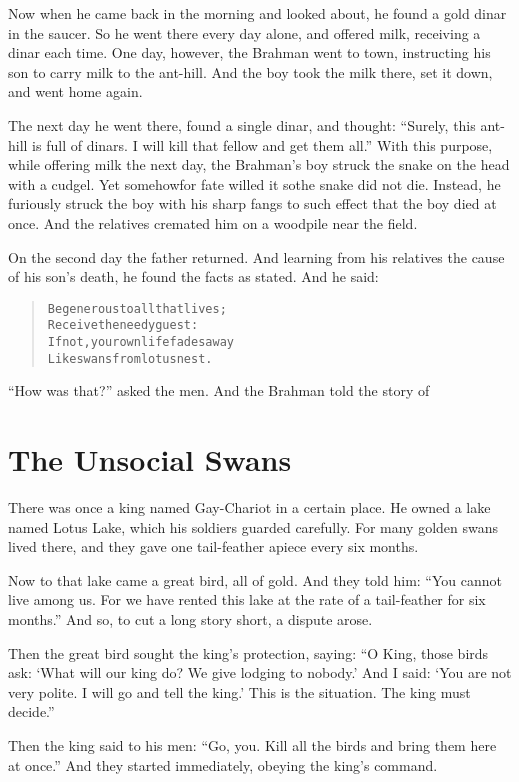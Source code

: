 \documentclass[article, twoside, 14pt]{memoir}
\renewenvironment{verbatim}{%
\begin{quote}%
\vskip -10pt%
\begin{alltt}\normalfont\large}{\end{alltt}%
\end{quote}%
\vskip -10pt
} %
\begin{document}
Now when he came back in the morning and looked about, he found a
gold dinar in the saucer. So he went there every day alone,
and offered milk, receiving a dinar each time. One day, however,
the Brahman went to town, instructing his son to carry milk to the
ant-hill. And the boy took the milk there, set it down, and went
home again.

The next day he went there, found a single dinar, and thought:
``Surely, this ant-hill is full of dinars. I will kill that fellow and get them all.''
With this purpose, while offering milk the next day, the Brahman's
boy struck the snake on the head with a cudgel. Yet somehow{\textemdash}for
fate willed it so{\textemdash}the snake did not die. Instead, he furiously
struck the boy with his sharp fangs to such effect that the boy
died at once. And the relatives cremated him on a woodpile near the
field.

On the second day the father returned. And learning from his
relatives the cause of his son's death, he found the facts as
stated. And he said:

\begin{verbatim}
Be generous to all that lives;
    Receive the needy guest:
If not, your own life fades away
    Like swans from lotus nest.
\end{verbatim}
``How was that?'' asked the men. And the Brahman told the story of

\chapter{The Unsocial Swans}

\label{s54}

There was once a king named Gay-Chariot in a certain place. He
owned a lake named Lotus Lake, which his soldiers guarded
carefully. For many golden swans lived there, and they gave one
tail-feather apiece every six months.

Now to that lake came a great bird, all of gold. And they told him:
``You cannot live among us. For we have rented this lake at the rate of a tail-feather for six months.''
And so, to cut a long story short, a dispute arose.

Then the great bird sought the king's protection, saying:
``O King, those birds ask: `What will our king do? We give lodging to nobody.' And I said: `You are not very polite. I will go and tell the king.' This is the situation. The king must decide.''

Then the king said to his men:
``Go, you. Kill all the birds and bring them here at once.'' And
they started immediately, obeying the king's command.
\end{document}
